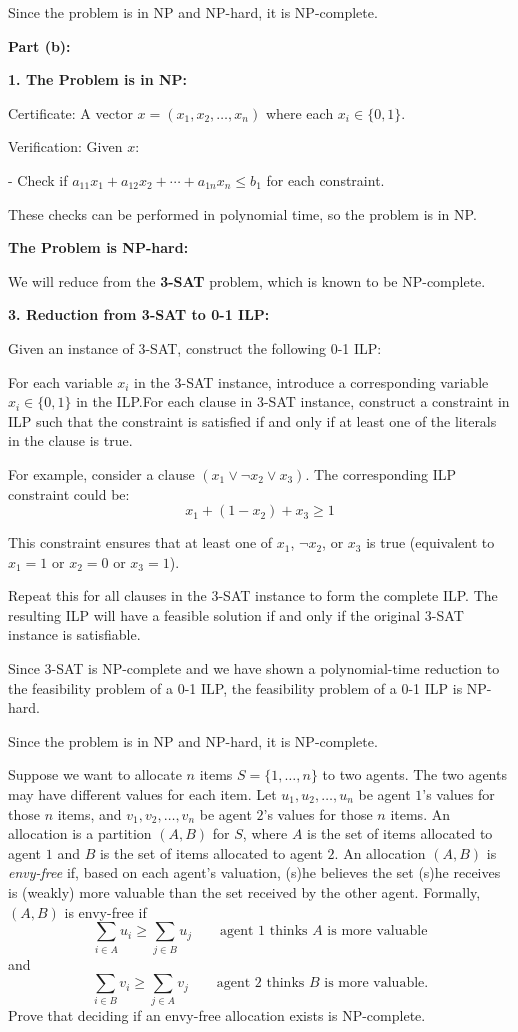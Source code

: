 \documentclass{oxmathproblems}
\begin{document}
\begin{questions}
Since the problem is in NP and NP-hard, it is NP-complete.

\textbf{Part (b):}

\textbf{1. The Problem is in NP:}

   Certificate: A vector \( x = (x_1, x_2, \ldots, x_n) \) where each \( x_i \in \{0, 1\} \).
   
   Verification: Given \( x \):
   
     - Check if \( a_{11} x_1 + a_{12} x_2 + \cdots + a_{1n} x_n \leq b_1 \) for each constraint.

   These checks can be performed in polynomial time, so the problem is in NP.

\textbf{The Problem is NP-hard:}

   We will reduce from the \textbf{3-SAT} problem, which is known to be NP-complete.

\textbf{3. Reduction from 3-SAT to 0-1 ILP:}

   Given an instance of 3-SAT, construct the following 0-1 ILP:
   
     For each variable \( x_i \) in the 3-SAT instance, introduce a corresponding variable \( x_i \in \{0, 1\} \) in the ILP.For each clause in  3-SAT instance, construct a constraint in  ILP such that the constraint is satisfied if and only if at least one of the literals in the clause is true.

   For example, consider a clause \( (x_1 \lor \neg x_2 \lor x_3) \). The corresponding ILP constraint could be:
   \[
   x_1 + (1 - x_2) + x_3 \geq 1
   \]

   This constraint ensures that at least one of \( x_1 \), \( \neg x_2 \), or \( x_3 \) is true (equivalent to \( x_1 = 1 \) or \( x_2 = 0 \) or \( x_3 = 1 \)).

   Repeat this for all clauses in the 3-SAT instance to form the complete ILP.
   The resulting ILP will have a feasible solution if and only if the original 3-SAT instance is satisfiable.

Since 3-SAT is NP-complete and we have shown a polynomial-time reduction to the feasibility problem of a 0-1 ILP, the feasibility problem of a 0-1 ILP is NP-hard.

Since the problem is in NP and NP-hard, it is NP-complete.

\miquestion[50]
Suppose we want to allocate $n$ items $S=\{1,\ldots,n\}$ to two agents.
The two agents may have different values for each item.
Let $u_1,u_2,\ldots,u_n$ be agent $1$'s values for those $n$ items, and $v_1,v_2,\ldots,v_n$ be agent $2$'s values for those $n$ items.
An allocation is a partition $(A,B)$ for $S$, where $A$ is the set of items allocated to agent $1$ and $B$ is the set of items allocated to agent $2$.
An allocation $(A,B)$ is \emph{envy-free} if, based on each agent's valuation, (s)he believes the set (s)he receives is (weakly) more valuable than the set received by the other agent.
Formally, $(A,B)$ is envy-free if
$$\sum_{i\in A}u_i\geq\sum_{j\in B}u_j\qquad\text{agent 1 thinks }A\text{ is more valuable}$$
and
$$\sum_{i\in B}v_i\geq\sum_{j\in A}v_j\qquad\text{agent 2 thinks }B\text{ is more valuable}.$$
Prove that deciding if an envy-free allocation exists is NP-complete.


\end{questions}
\end{document}
